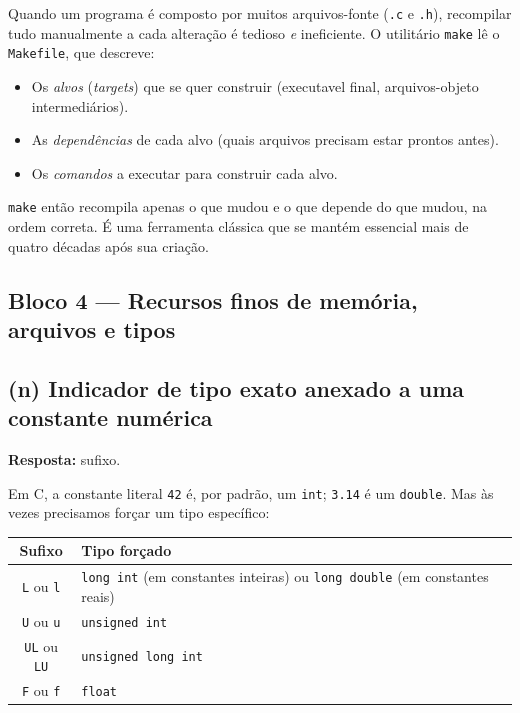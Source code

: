 \documentclass[11pt,a4paper]{article}
\begin{document}
Quando um programa \'e composto por muitos arquivos-fonte (\texttt{.c} e \texttt{.h}), recompilar tudo manualmente a cada altera\c{c}\~ao \'e tedioso \emph{e} ineficiente. O utilit\'ario \texttt{make} l\^e o \texttt{Makefile}, que descreve:

\begin{itemize}[leftmargin=*, itemsep=0pt]
  \item Os \emph{alvos} (\emph{targets}) que se quer construir (executavel final, arquivos-objeto intermedi\'arios).
  \item As \emph{depend\^encias} de cada alvo (quais arquivos precisam estar prontos antes).
  \item Os \emph{comandos} a executar para construir cada alvo.
\end{itemize}

\texttt{make} ent\~ao recompila apenas o que mudou e o que depende do que mudou, na ordem correta. \'E uma ferramenta cl\'assica que se mant\'em essencial mais de quatro d\'ecadas ap\'os sua cria\c{c}\~ao.

\subsection*{Bloco 4 --- Recursos finos de mem\'oria, arquivos e tipos}

\subsection*{(n) Indicador de tipo exato anexado a uma constante num\'erica}

\begin{resposta}\textbf{Resposta:} sufixo.\end{resposta}

Em C, a constante literal \texttt{42} \'e, por padr\~ao, um \texttt{int}; \texttt{3.14} \'e um \texttt{double}. Mas \`as vezes precisamos for\c{c}ar um tipo espec\'ifico:

\begin{center}
\renewcommand{\arraystretch}{1.3}
\begin{tabular}{|c|l|}
\hline
\textbf{Sufixo} & \textbf{Tipo for\c{c}ado} \\
\hline
\texttt{L} ou \texttt{l}   & \texttt{long int} (em constantes inteiras) ou \texttt{long double} (em constantes reais) \\
\texttt{U} ou \texttt{u}   & \texttt{unsigned int} \\
\texttt{UL} ou \texttt{LU} & \texttt{unsigned long int} \\
\texttt{F} ou \texttt{f}   & \texttt{float} \\
\hline
\end{tabular}
\end{center}
\end{document}
